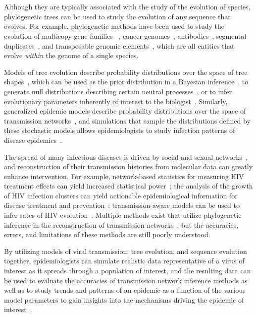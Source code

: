 \chapter*{\introtitle}
\clearpage

Although they are typically associated with the study of the evolution of species, phylogenetic trees can be used to study the evolution of any sequence that evolves. For example, phylogenetic methods have been used to study the evolution of multicopy gene families~ \cite{Page1997}, cancer genomes~\cite{El-Kebir2016,Nowell1976}, antibodies~\cite{Litman1993,Robinson2015,Safonova2015}, segmental duplicates~\cite{Bailey2006,Jiang2007}, and transposable genomic elements~\cite{Dewannieux2003,Moshiri2017}, which are all entities that evolve \textit{within} the genome of a single species.

Models of tree evolution describe probability distributions over the space of tree shapes~\cite{Yule1925,Aldous2001}, which can be used as the prior distribution in a Bayesian inference~\cite{Drummond2007,Mooers2012,Sayyari2016}, to generate null distributions describing certain neutral processes~\cite{Guyer1991,Kirkpatrick1993,Agapow2002}, or to infer evolutionary parameters inherently of interest to the biologist~\cite{Morlon2014}. Similarly, generalized epidemic models describe probability distributions over the space of transmission networks~\cite{Sahneh2013}, and simulations that sample the distributions defined by these stochastic models allows epidemiologists to study infection patterns of disease epidemics~\cite{Sahneh2017}.

The spread of many infectious diseases is driven by social and sexual networks~\cite{Rivas2012}, and reconstruction of their transmission histories from molecular data can greatly enhance intervention. For example, network-based statistics for measuring \gls{HIV} treatment effects can yield increased statistical power~\cite{Wertheim2011}; the analysis of the growth of \gls{HIV} infection clusters can yield actionable epidemiological information for disease treatment and prevention~\cite{Aldous2012,Brenner2013}; transmission-aware models can be used to infer rates of \gls{HIV} evolution~\cite{Vrancken2014}. Multiple methods exist that utilize phylogenetic inference in the reconstruction of transmission networks~\cite{Prosperi2011,Ragonnet-Cronin2013,Moshiri2018b,Balaban2019}, but the accuracies, errors, and limitations of these methods are still poorly understood.

By utilizing models of viral transmission, tree evolution, and sequence evolution together, epidemiologists can simulate realistic data representative of a virus of interest as it spreads through a population of interest, and the resulting data can be used to evaluate the accuracies of transmission network inference methods as well as to study trends and patterns of an epidemic as a function of the various model parameters to gain insights into the mechanisms driving the epidemic of interest~\cite{Ratmann2017}.

